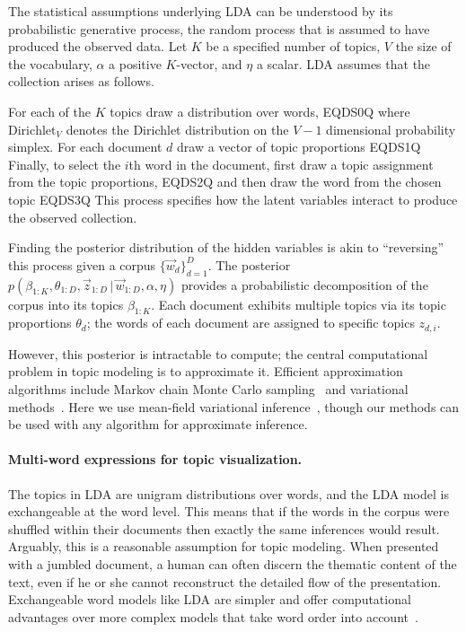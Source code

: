 \documentclass[11pt]{article}
\begin{document}
The statistical assumptions underlying LDA can be understood by its
probabilistic generative process, the random process that is assumed
to have produced the observed data.  Let $K$ be a specified number of
topics, $V$ the size of the vocabulary, $\alpha$ a positive
$K$-vector, and $\eta$ a scalar.  LDA assumes that the collection
arises as follows.

For each of the $K$ topics draw a distribution over words,
EQDS0Q where ${\textrm{Dirichlet}}_V$ denotes the
Dirichlet distribution on the $V-1$ dimensional probability simplex.
For each document $d$ draw a vector of topic proportions
EQDS1Q
Finally, to select the $i$th word in the document, first draw a topic
assignment from the topic proportions,
EQDS2Q and then draw the word
from the chosen topic
EQDS3Q This process
specifies how the latent variables interact to produce the observed
collection.

Finding the posterior distribution of the hidden variables is akin to
``reversing'' this process given a corpus $\{\vec{w}_d\}_{d=1}^{D}$.
The posterior $p(\beta_{1:K}, \theta_{1:D}, \vec{z}_{1:D} {\,|\,}
\vec{w}_{1:D}, \alpha, \eta)$ provides a probabilistic decomposition
of the corpus into its topics $\beta_{1:K}$.  Each document exhibits
multiple topics via its topic proportions $\theta_d$; the words of
each document are assigned to specific topics $z_{d,i}$.

However, this posterior is intractable to compute; the central
computational problem in topic modeling is to approximate it.
Efficient approximation algorithms include Markov chain Monte Carlo
sampling~\citep{Griffiths:2006} and variational
methods~\citep{Minka:2002,Blei:2003b,Teh:2006}.  Here we use
mean-field variational inference~\citep{Blei:2003b}, though our
methods can be used with any algorithm for approximate inference.

\paragraph{Multi-word expressions for topic visualization.}
\label{sec:strategy}

The topics in LDA are unigram distributions over words, and the LDA
model is exchangeable at the word level.  This means that if the words
in the corpus were shuffled within their documents then exactly the
same inferences would result.  Arguably, this is a reasonable
assumption for topic modeling.  When presented with a jumbled
document, a human can often discern the thematic content of the text,
even if he or she cannot reconstruct the detailed flow of the
presentation.  Exchangeable word models like LDA are simpler and offer
computational advantages over more complex models that take word order
into account~\citep{Girolami:2004,Wallach:2006,Wang:2007}.
\end{document}
